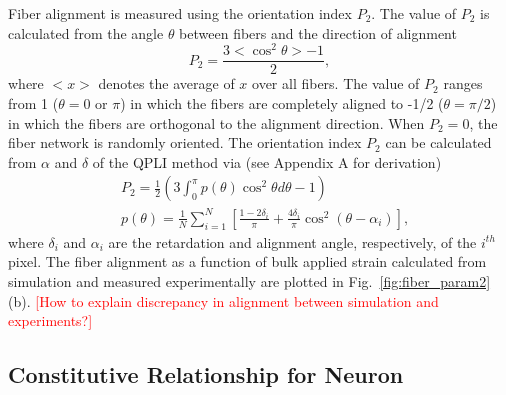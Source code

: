 \documentclass[]{interact}
\newcommand{\red}[1]{\textcolor{red}{[#1]}}
\begin{document}
Fiber alignment is measured using the orientation index $P_2$. The value of $P_2$ is calculated from the angle $\theta$ between fibers and the direction of alignment
%
\begin{equation}
P_2 = \frac{3 <\cos^2\theta> - 1}{2},
\label{eq:P2_simulation}
\end{equation}
%
where $<x>$ denotes the average of $x$ over all fibers. The value of $P_2$ ranges from 1 ($\theta=0$ or $\pi$) in which the fibers are completely aligned to -1/2 ($\theta=\pi/2$) in which the fibers are orthogonal to the alignment direction. When $P_2=0$, the fiber network is randomly oriented. The orientation index $P_2$ can be calculated from $\alpha$ and $\delta$ of the QPLI method via (see Appendix A for derivation)
%
\begin{align}
&P_2 = \frac{1}{2}\left(3 \int_0^{\pi} p(\theta) \cos^2\theta d\theta - 1\right) \nonumber\\
&p(\theta) = \frac{1}{N} \sum_{i=1}^N \left[ \frac{1-2\delta_i}{\pi} + \frac{4 \delta_i}{\pi}\cos^2(\theta - \alpha_i)\right],
\label{eq:P2_experiment}
\end{align}
%
where $\delta_i$ and $\alpha_i$ are the retardation and alignment angle, respectively, of the $i^{th}$ pixel. The fiber alignment as a function of bulk applied strain calculated from simulation and measured experimentally are plotted in Fig.\ \ref{fig:fiber_param2}(b). \red{How to explain discrepancy in alignment between simulation and experiments?}


\subsection{Constitutive Relationship for Neuron}
\end{document}
